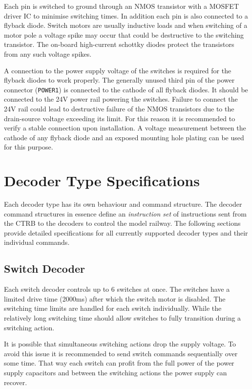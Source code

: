 \documentclass{scrreprt}
\begin{document}
Each pin is switched to ground through an NMOS transistor with a MOSFET driver IC to minimise switching times.
In addition each pin is also connected to a flyback diode.
Switch motors are usually inductive loads and when switching of a motor pole a voltage spike may occur that could be destructive to the switching transistor.
The on-board high-current schottky diodes protect the transistors from any such voltage spikes.

A connection to the power supply voltage of the switches is required for the flyback diodes to work properly.
The generally unused third pin of the power connector (\texttt{POWER1}) is connected to the cathode of all flyback diodes.
It should be connected to the 24V power rail powering the switches.
Failure to connect the 24V rail could lead to destructive failure of the NMOS transistors due to the drain-source voltage exceeding its limit.
For this reason it is recommended to verify a stable connection upon installation.
A voltage measurement between the cathode of any flyback diode and an exposed mounting hole plating can be used for this purpose.

\chapter{Decoder Type Specifications}
Each decoder type has its own behaviour and command structure.
The decoder command structures in essence define an \emph{instruction set} of instructions sent from the CTRB to the decoders to control the model railway.
The following sections provide detailed specifications for all currently supported decoder types and their individual commands.

\section{Switch Decoder}
Each switch decoder controls up to 6 switches at once.
The switches have a limited drive time (2000ms) after which the switch motor is disabled.
The switching time limits are handled for each switch individually.
While the relatively long switching time should allow switches to fully transition during a switching action.

It is possible that simultaneous switching actions drop the supply voltage.
To avoid this issue it is recommended to send switch commands sequentially over some time.
That way each switch can profit from the full power of the power supply capacitors and between the switching actions the power supply can recover.
\end{document}
